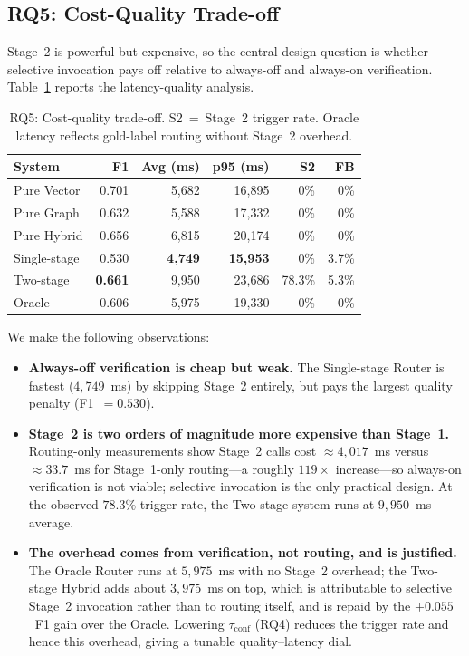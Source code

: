 ﻿\documentclass[11pt,twocolumn]{article}
\begin{document}
\subsection{RQ5: Cost-Quality Trade-off}
\label{subsec:rq5}

Stage~2 is powerful but expensive, so the central design question is
whether selective invocation pays off relative to always-off and always-on
verification. Table~\ref{tab:cost} reports the latency-quality analysis.

\begin{table}[!htbp]
\centering
\caption{RQ5: Cost-quality trade-off. S2~=~Stage~2 trigger rate.
Oracle latency reflects gold-label routing without Stage~2 overhead.}
\label{tab:cost}
\scriptsize
\setlength{\tabcolsep}{3pt}
\renewcommand{\arraystretch}{1.05}
\begin{tabular}{lrrrrr}
\toprule
\textbf{System} & \textbf{F1} & \textbf{Avg (ms)} &
\textbf{p95 (ms)} & \textbf{S2} & \textbf{FB} \\
\midrule
Pure Vector & 0.701 & 5,682 & 16,895 & 0\% & 0\% \\
Pure Graph & 0.632 & 5,588 & 17,332 & 0\% & 0\% \\
Pure Hybrid & 0.656 & 6,815 & 20,174 & 0\% & 0\% \\
Single-stage & 0.530 & \textbf{4,749} & \textbf{15,953} & 0\% & 3.7\% \\
Two-stage & \textbf{0.661} & 9,950 & 23,686 & 78.3\% & 5.3\% \\
\midrule
Oracle & 0.606 & 5,975 & 19,330 & 0\% & 0\% \\
\bottomrule
\end{tabular}
\end{table}

We make the following observations:
\begin{itemize}
  \item \textbf{Always-off verification is cheap but weak.} The
  Single-stage Router is fastest ($4{,}749$~ms) by skipping Stage~2
  entirely, but pays the largest quality penalty (F1~$=0.530$).

  \item \textbf{Stage~2 is two orders of magnitude more expensive than
  Stage~1.} Routing-only measurements show Stage~2 calls cost
  $\approx\!4{,}017$~ms versus $\approx\!33.7$~ms for Stage~1-only
  routing---a roughly $119\times$ increase---so always-on verification is
  not viable; selective invocation is the only practical design. At the
  observed $78.3\%$ trigger rate, the Two-stage system runs at
  $9{,}950$~ms average.

  \item \textbf{The overhead comes from verification, not routing, and is
  justified.} The Oracle Router runs at $5{,}975$~ms with no Stage~2
  overhead; the Two-stage Hybrid adds about $3{,}975$~ms on top, which is
  attributable to selective Stage~2 invocation rather than to routing
  itself, and is repaid by the $+0.055$~F1 gain over the Oracle. Lowering
  $\tau_{\mathrm{conf}}$ (RQ4) reduces the trigger rate and hence this
  overhead, giving a tunable quality--latency dial.
\end{itemize}
\end{document}
